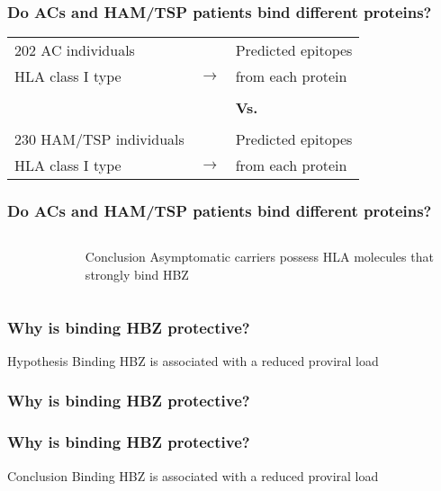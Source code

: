 \documentclass[slidescentered,compress]{beamer}
\begin{document}
\frame
{
\frametitle{Do ACs and HAM/TSP patients bind different proteins?}
\begin{table}[htbp]
\centering
\begin{tabular}{lll}
202 AC individuals & & Predicted epitopes \\
HLA class I type & $\longrightarrow$ & from each protein \\
\\
& & \bf{Vs.} \\
\\
230 HAM/TSP individuals & & Predicted epitopes \\
HLA class I type & $\longrightarrow$ & from each protein \\
\end{tabular}
\end{table}
}

\frame
{
\frametitle{Do ACs and HAM/TSP patients bind different proteins?}

\begin{columns}[c]

\begin{column}{6cm}
\begin{figure}
\end{figure}
\end{column}

\pause

\begin{column}{5cm}
\begin{block}{Conclusion}
Asymptomatic carriers possess HLA molecules that strongly bind HBZ
\end{block}
\end{column}

\end{columns}
}


\frame
{
\frametitle{Why is binding HBZ protective?}

\begin{block}{Hypothesis}
Binding HBZ is associated with a reduced proviral load
\end{block}

}

\frame
{
\frametitle{Why is binding HBZ protective?}

\begin{figure}
\end{figure}

}

\frame
{
\frametitle{Why is binding HBZ protective?}

\begin{block}{Conclusion}
Binding HBZ is associated with a reduced proviral load
\end{block}

}
\end{document}
